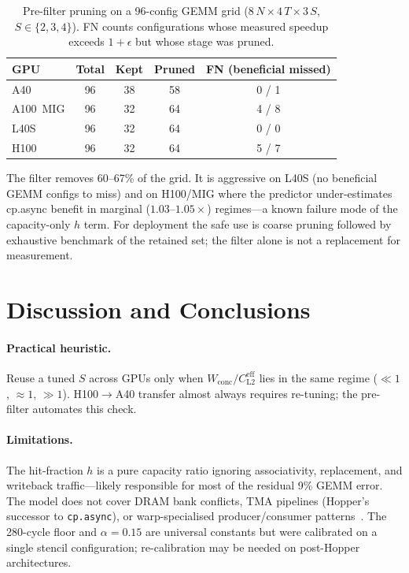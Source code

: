 \documentclass[10pt,twocolumn]{article}
\newcommand{\cpasync}{\texttt{cp.async}}
\newcommand{\wconc}{W_{\text{conc}}}
\newcommand{\cleff}{C_{\text{L2}}^{\text{eff}}}
\begin{document}
\begin{table}[h]
\centering
\footnotesize
\caption{Pre-filter pruning on a 96-config GEMM grid
($8\,N \times 4\,T \times 3\,S$, $S \in \{2,3,4\}$).  FN counts
configurations whose measured speedup exceeds $1{+}\epsilon$ but
whose stage was pruned.}
\label{tab:prefilter}
\renewcommand{\arraystretch}{1.1}
\begin{tabular}{@{}lcccc@{}}
\toprule
GPU & Total & Kept & Pruned & FN (beneficial missed) \\
\midrule
A40       & 96 & 38 & 58 & 0 / 1 \\
A100~MIG  & 96 & 32 & 64 & 4 / 8 \\
L40S      & 96 & 32 & 64 & 0 / 0 \\
H100      & 96 & 32 & 64 & 5 / 7 \\
\bottomrule
\end{tabular}
\end{table}

The filter removes 60--67\% of the grid.  It is aggressive on L40S
(no beneficial GEMM configs to miss) and on H100/MIG where the
predictor under-estimates cp.async benefit in marginal
($1.03\text{--}1.05\times$) regimes---a known failure mode of the
capacity-only $h$ term.  For deployment the safe use is coarse
pruning followed by exhaustive benchmark of the retained set; the
filter alone is not a replacement for measurement.

\section{Discussion and Conclusions}
\label{sec:conclusions}

\paragraph{Practical heuristic.}
Reuse a tuned $S$ across GPUs only when $\wconc/\cleff$ lies in the
same regime ($\ll 1$, $\approx 1$, $\gg 1$).  H100$\to$A40 transfer
almost always requires re-tuning; the pre-filter automates this
check.

\paragraph{Limitations.}
The hit-fraction $h$ is a pure capacity ratio ignoring
associativity, replacement, and writeback traffic---likely
responsible for most of the residual 9\% GEMM error.  The model
does not cover DRAM bank conflicts, TMA pipelines (Hopper's
successor to \cpasync{}), or warp-specialised producer/consumer
patterns~\cite{tawa,twill}.  The 280-cycle floor and
$\alpha{=}0.15$ are universal constants but were calibrated on a
single stencil configuration; re-calibration may be needed on
post-Hopper architectures.
\end{document}
